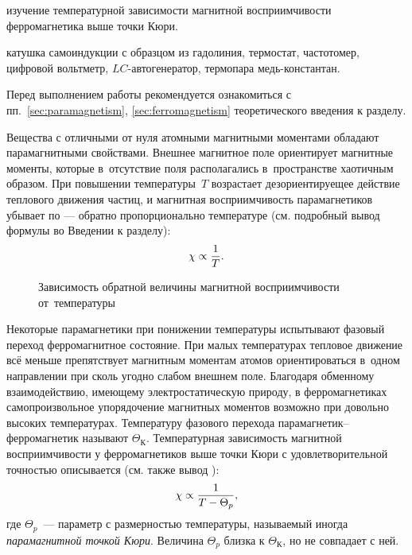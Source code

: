 
\begin{lab:aim}
изучение температурной зависимости магнитной восприимчивости ферромагнетика
выше точки Кюри.
\end{lab:aim}

\begin{lab:equipment}
катушка самоиндукции с образцом из гадолиния, термостат, частотомер,
цифровой вольтметр, $LC$-автогенератор, термопара медь-константан.
\end{lab:equipment}

Перед выполнением работы рекомендуется ознакомиться с
пп.~\ref{sec:paramagnetism}, \ref{sec:ferromagnetism} теоретического
введения к разделу.

Вещества с отличными от нуля атомными магнитными моментами обладают
парамагнитными свойствами. Внешнее магнитное поле ориентирует магнитные моменты,
которые в~отсутствие поля располагались в~пространстве хаотичным образом.
При повышении температуры~$T$ возрастает дезориентируещее действие теплового
движения частиц, и магнитная восприимчивость парамагнетиков убывает
по  --- обратно пропорционально температуре (см.
подробный вывод формулы  во Введении к разделу):
\begin{equation}%
	\chi\propto \frac{1}{T}.
	\eqmark{curi}
\end{equation}

\begin{wrapfigure}{r}{0.4\textwidth}
    \caption{Зависимость обратной величины магнитной восприимчивости
от~температуры}
\end{wrapfigure}

Некоторые парамагнетики при понижении температуры испытывают
фазовый переход ферромагнитное состояние. При малых температурах
тепловое движение всё меньше препятствует магнитным моментам атомов
ориентироваться в~одном направлении при сколь угодно слабом внешнем поле.
Благодаря обменному взаимодействию, имеющему электростатическую природу,
в ферромагнетиках самопроизвольное упорядочение магнитных моментов
возможно при довольно высоких температурах. Температуру фазового перехода
парамагнетик--ферромагнетик называют  $\Theta_К$.
Температурная зависимость магнитной восприимчивости у ферромагнетиков
выше точки Кюри с удовлетворительной точностью
описывается  (см. также вывод
):
\begin{equation}%
    \chi\propto \frac{1}{T-\Theta_p},
    \eqmark{curi-veis}
\end{equation}
где $\Theta_p$~--- параметр с размерностью температуры, называемый
иногда \emph{парамагнитной точкой Кюри}. Величина $\Theta_p$ близка к
$\Theta_К$, но не совпадает с ней.

